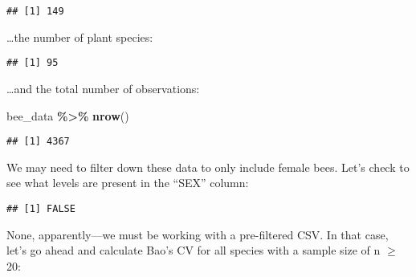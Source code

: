 \documentclass[
]{article}
\newenvironment{Shaded}{\begin{snugshade}}{\end{snugshade}}
\newcommand{\FunctionTok}[1]{\textcolor[rgb]{0.13,0.29,0.53}{\textbf{#1}}}
\newcommand{\NormalTok}[1]{#1}
\newcommand{\SpecialCharTok}[1]{\textcolor[rgb]{0.81,0.36,0.00}{\textbf{#1}}}
\begin{document}
\begin{verbatim}
## [1] 149
\end{verbatim}

\ldots the number of plant species:

\begin{Shaded}
\end{Shaded}

\begin{verbatim}
## [1] 95
\end{verbatim}

\ldots and the total number of observations:

\begin{Shaded}
\begin{Highlighting}[]
\NormalTok{bee\_data }\SpecialCharTok{\%\textgreater{}\%} \FunctionTok{nrow}\NormalTok{()}
\end{Highlighting}
\end{Shaded}

\begin{verbatim}
## [1] 4367
\end{verbatim}

We may need to filter down these data to only include female bees. Let's
check to see what levels are present in the ``SEX'' column:

\begin{Shaded}
\end{Shaded}

\begin{verbatim}
## [1] FALSE
\end{verbatim}

None, apparently---we must be working with a pre-filtered CSV. In that
case, let's go ahead and calculate Bao's CV for all species with a
sample size of n \(\geq\) 20:
\end{document}
